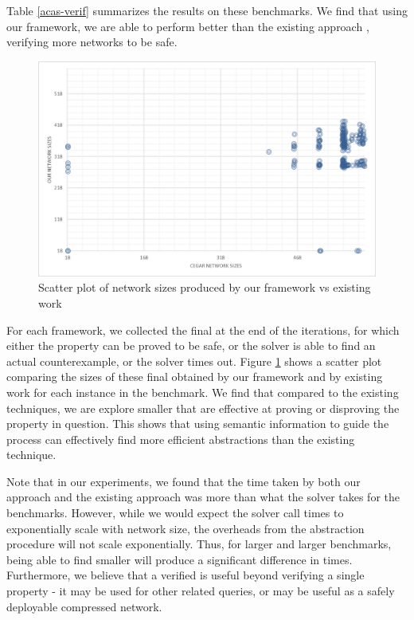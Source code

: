 Table \ref{acas-verif} summarizes the results on these benchmarks. We find that
using our framework, we are able to perform better than the existing \cegar
approach \cite{cegar-nn}, verifying more networks to be safe.

\begin{figure}
    \centering
    \includegraphics[scale=0.25]{figs/scatter-cegar-our-nerualsat.png}
    \caption{Scatter plot of network sizes produced by our framework vs existing
    work \cite{cegar-nn} }
    \label{f:scatter-netsizes}
\end{figure}

For each framework, we collected the final \abs at the end of the \cegar
iterations, for which either the property can be proved to be safe, or 
the solver is able to find an actual counterexample, or the solver times out.  
Figure \ref{f:scatter-netsizes} shows a scatter plot comparing the sizes of these final \abs
obtained by our framework and by existing work \cite{cegar-nn} for each instance
in the benchmark.
We find that compared to the existing techniques, we are explore smaller
\abs that are effective at proving or disproving the property in question. This
shows that using semantic information to guide the \cegar process can
effectively find more efficient abstractions than the existing technique.

Note that in our experiments, we found that the time taken by both our \cegar
approach and the existing \cegar approach \cite{cegar-nn} was more than what the
\neuralsat solver takes for the \acasxu benchmarks. However, while we would
expect the solver call times to exponentially scale with network size, the
overheads from the abstraction procedure will not scale exponentially. Thus, for
larger and larger benchmarks, being able to find smaller \abs will produce a
significant difference in times. Furthermore, we believe that a verified \abs is
useful beyond verifying a single property - it may be used for other related
queries, or may be useful as a safely deployable compressed network.

